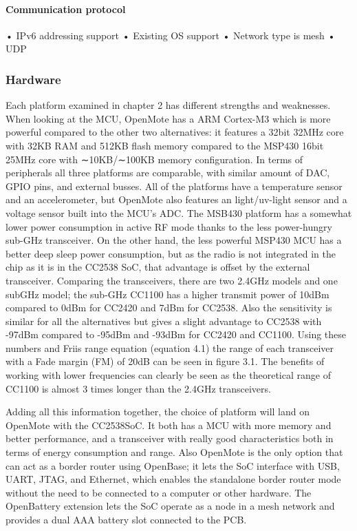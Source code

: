 \paragraph{Communication protocol}
• IPv6 addressing support
• Existing OS support
• Network type is mesh
• UDP

\subsubsection{Hardware}
Each platform examined in chapter 2 has different strengths and weaknesses.
When looking at the MCU,
	OpenMote has a ARM Cortex-M3 which is more powerful compared to the other two alternatives:
	it features a 32bit 32MHz core with 32KB RAM and 512KB flash memory compared to the MSP430 16bit 25MHz core with ∼10KB/∼100KB memory configuration.
In terms of peripherals all three platforms are comparable,
	with similar amount of DAC,
	GPIO pins,
	and external busses.
All of the platforms have a temperature sensor and an accelerometer,
	but OpenMote also features an light/uv-light sensor and a voltage sensor built into the MCU’s ADC.
The MSB430 platform has a somewhat lower power consumption in active RF mode thanks to the less power-hungry sub-GHz transceiver.
On the other hand,
	the less powerful MSP430 MCU has a better deep sleep power consumption,
	but as the radio is not integrated in the chip as it is in the CC2538 SoC,
	that advantage is offset by the external transceiver.
Comparing the transceivers,
	there are two 2.4GHz models and one subGHz model;
	the sub-GHz CC1100 has a higher transmit power of 10dBm compared to 0dBm for CC2420 and 7dBm for CC2538.
Also the sensitivity is similar for all the alternatives but gives a slight advantage to CC2538 with -97dBm compared to -95dBm and -93dBm for CC2420 and CC1100.
Using these numbers and Friis range equation (equation 4.1) the range of each transceiver with a Fade margin (FM) of 20dB can be seen in figure 3.1.
The benefits of working with lower frequencies can clearly be seen as the theoretical range of CC1100 is almost 3 times longer than the 2.4GHz transceivers.

Adding all this information together,
	the choice of platform will land on OpenMote with the CC2538SoC.
It both has a MCU with more memory and better performance,
	and a transceiver with really good characteristics both in terms of energy consumption and range.
Also OpenMote is the only option that can act as a border router using OpenBase;
	it lets the SoC interface with USB,
	UART,
	JTAG,
	and Ethernet,
	which enables the standalone border router mode without the need to be connected to a computer or other hardware.
The OpenBattery extension lets the SoC operate as a node in a mesh network and provides a dual AAA battery slot connected to the PCB.

